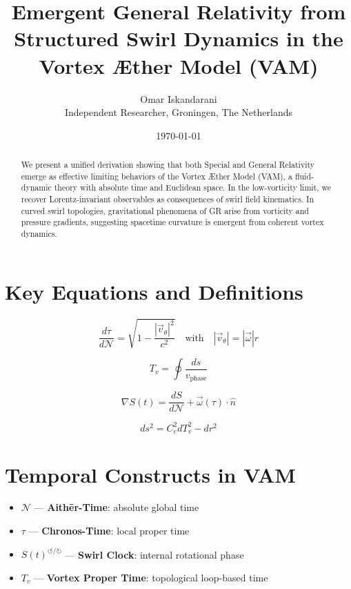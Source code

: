 \documentclass[12pt]{article}
\title{Emergent General Relativity from Structured Swirl Dynamics in the Vortex Æther Model (VAM)}
\author{Omar Iskandarani\\Independent Researcher, Groningen, The Netherlands}
\date{\today}
\begin{document}
\maketitle

\begin{abstract}
We present a unified derivation showing that both Special and General Relativity emerge as effective limiting behaviors of the Vortex Æther Model (VAM), a fluid-dynamic theory with absolute time and Euclidean space. In the low-vorticity limit, we recover Lorentz-invariant observables as consequences of swirl field kinematics. In curved swirl topologies, gravitational phenomena of GR arise from vorticity and pressure gradients, suggesting spacetime curvature is emergent from coherent vortex dynamics.
\end{abstract}

\section*{Key Equations and Definitions}

\begin{equation}
\boxed{
    \frac{d\tau}{d\mathcal{N}} = \sqrt{1 - \frac{|\vec{v}_\theta|^2}{c^2}}
} \quad \text{with} \quad |\vec{v}_\theta| = |\vec{\omega}| r
\label{eq:tau-dilation}
\end{equation}

\begin{equation}
\boxed{
    T_v = \oint \frac{ds}{v_\text{phase}}
}
\label{eq:vortex-proper-time}
\end{equation}

\begin{equation}
\boxed{
    \nabla S(t) = \frac{dS}{d\mathcal{N}} + \vec{\omega}(\tau) \cdot \hat{n}
}
\label{eq:swirl-clock-gradient}
\end{equation}

\begin{equation}
\boxed{
    ds^2 = C_e^2 dT_v^2 - dr^2
}
\label{eq:swirl-metric}
\end{equation}

\section*{Temporal Constructs in VAM}

\begin{tcolorbox}[title=Temporal Modes in the Vortex Æther Model, colback=gray!5, colframe=black!70]
\begin{itemize}
    \item \( \mathcal{N} \) — \textbf{Aithēr-Time}: absolute global time
    \item \( \tau \) — \textbf{Chronos-Time}: local proper time
    \item \( S(t)^{\circlearrowleft/\circlearrowright} \) — \textbf{Swirl Clock}: internal rotational phase
    \item \( T_v \) — \textbf{Vortex Proper Time}: topological loop-based time
\end{itemize}
\end{tcolorbox}
\end{document}
